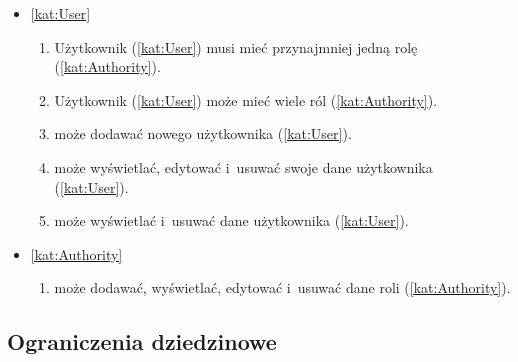 \begin{itemize}[label={\textbf{Reguły dla}}, wide, labelwidth=!, labelindent=0pt]
    \setlength\itemsep{1.75em}
    \item\ref{kat:User}\mynobreakpar
    \begin{enumerate}[label={\textbf{REG/\protect\threedigits{\arabic{enumi}}}}, wide, labelwidth=!, align=left, leftmargin=3cm]
        \item Użytkownik (\ref{kat:User}) musi mieć przynajmniej jedną rolę (\ref{kat:Authority}).
        \item Użytkownik (\ref{kat:User}) może mieć wiele ról (\ref{kat:Authority}).
        \item {} może dodawać nowego użytkownika (\ref{kat:User}).
        \item {} może wyświetlać, edytować i~usuwać swoje dane użytkownika (\ref{kat:User}).
        \item {} może wyświetlać i~usuwać dane użytkownika (\ref{kat:User}).
    \end{enumerate}
    \item\ref{kat:Authority}\mynobreakpar
    \begin{enumerate}[label={\textbf{REG/\protect\threedigits{\arabic{enumi}}}}, wide, labelwidth=!, align=left, leftmargin=3cm, resume]
        \item {} może dodawać, wyświetlać, edytować i~usuwać dane roli (\ref{kat:Authority}).
    \end{enumerate}
\end{itemize}

\subsection{Ograniczenia dziedzinowe}\label{subsec:database:restrictions}

